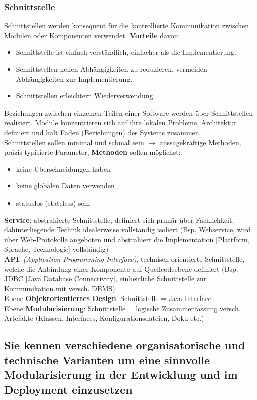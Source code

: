\documentclass[a4paper]{article}
\begin{document}
	\subsubsection{Schnittstelle}
	Schnittstellen werden konsequent für die kontrollierte Kommunikation zwischen Modulen oder Komponenten verwendet. \textbf{Vorteile} davon:
	\begin{itemize}
		\setlength\itemsep{0em}
		\item Schnittstelle ist einfach verständlich, einfacher als die Implementierung.
		\item Schnittstellen helfen Abhängigkeiten zu reduzieren, vermeiden Abhängigkeiten zur Implementierung.
		\item Schnittstellen erleichtern Wiederverwendung.
	\end{itemize}
	Beziehungen zwischen einzelnen Teilen einer Software werden über Schnittstellen realisiert. Module konzentrieren sich auf ihre lokalen Probleme, Architektur definiert und hält Fäden (Beziehungen) des Systems zusammen.\\
	Schnittstellen sollen minimal und schmal sein $\rightarrow$ aussagekräftige Methoden, präzis typisierte Parameter, \textbf{Methoden} sollen möglichst:
	\begin{itemize}
		\setlength\itemsep{0em}
		\item keine Überschneidungen haben
		\item keine globalen Daten verwenden
		\item statuslos (stateless) sein
	\end{itemize}
	\textbf{Service}: abstrahierte Schnittstelle, definiert sich primär über Fachlichkeit, dahinterliegende Technik idealerweise vollständig isoliert (Bsp. Webservice, wird über Web-Protokolle angeboten und abstrahiert die Implementation [Plattform, Sprache, Technologie] vollständig) \\
	\textbf{API}: \textit{(Application Programming Interface)}, technisch orientierte Schnittstelle, welche die Anbindung einer Komponente auf Quellcodeebene definiert (Bsp. JDBC [Java Database Connectivity], einheitliche Schnittstelle zur Kommunikation mit versch. DBMS) \\
	Ebene \textbf{Objektorientiertes Design}: Schnittstelle = Java Interface \\
	Ebene \textbf{Modularisierung}: Schnittstelle = logische Zusammenfassung versch. Artefakte (Klassen, Interfaces, Konfigurationsdateien, Doku etc.)
	
	\newpage
	\subsection{Sie kennen verschiedene organisatorische und technische Varianten um eine sinnvolle Modularisierung in der Entwicklung und im Deployment einzusetzen}
\end{document}
